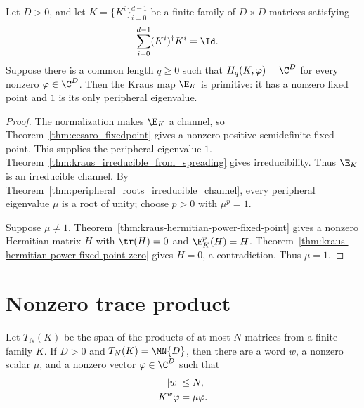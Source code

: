 \begin{theorem}
    \label{thm:kraus_primitive_from_tp_spreading}
    \leanok
    Let $D>0$, and let $K=\{K^i\}_{i=0}^{d-1}$ be a finite family of
    $D\times D$ matrices satisfying
    \begin{align}
        \sum_{i=0}^{d-1}(K^i)^\dagger K^i
         & =\Id.
        \notag
    \end{align}
    Suppose there is a common length $q\ge0$ such that
    $H_q(K,\varphi)=\C^D$ for every nonzero $\varphi\in\C^D$.
    Then the Kraus map $\E_K$ is primitive: it has a nonzero fixed point and
    $1$ is its only peripheral eigenvalue.
\end{theorem}

\begin{proof}\leanok
    The normalization makes $\E_K$ a channel, so
    Theorem~\ref{thm:cesaro_fixedpoint} gives a nonzero positive-semidefinite
    fixed point. This supplies the peripheral eigenvalue $1$.
    Theorem~\ref{thm:kraus_irreducible_from_spreading} gives irreducibility.
    Thus $\E_K$ is an irreducible channel. By
    Theorem~\ref{thm:peripheral_roots_irreducible_channel}, every peripheral
    eigenvalue $\mu$ is a root of unity; choose $p>0$ with
    $\mu^p=1$.

    Suppose $\mu\neq1$. Theorem~\ref{thm:kraus-hermitian-power-fixed-point}
    gives a nonzero Hermitian matrix $H$ with $\tr(H)=0$ and
    $\E_K^p(H)=H$. Theorem~\ref{thm:kraus-hermitian-power-fixed-point-zero}
    gives $H=0$, a contradiction. Thus $\mu=1$.
\end{proof}

\section{Nonzero trace product}

\begin{theorem}
    \label{thm:eigenvector_from_full_cumulative_span}
    \leanok
    Let $T_N(K)$ be the span of the products of at most $N$ matrices from a
    finite family $K$. If $D>0$ and $T_N(K)=\MN{D}$, then there are a word
    $w$, a nonzero scalar $\mu$, and a nonzero vector $\varphi\in\C^D$ such
    that
    \begin{align}
        |w| & \le N, \notag\\
        K^w\varphi & = \mu\varphi. \notag
    \end{align}
\end{theorem}

